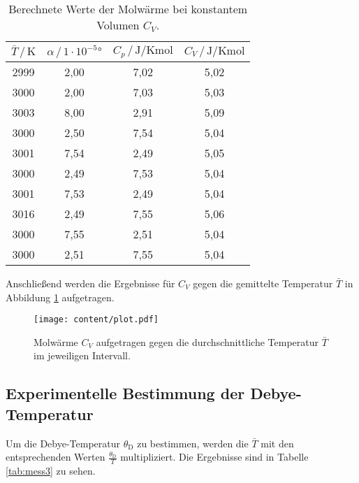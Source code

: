 \begin{table}
    \centering
    \caption{Berechnete Werte der Molwärme bei konstantem Volumen $C_V$.}
    \label{tab:mess2}
    \begin{tabular}{c c c c}
    \toprule
    $\bar{T} \,/\, \si{\kelvin}$ & $\alpha \,/\, 1\cdot 10^{-5}\si{\degree}$ & $C_p \,/\, \si{\joule\per\kelvin\mole}$
    & $C_V \,/\, \si{\joule\per\kelvin\mole}$\\
    \midrule 
        2999 & 2,00 & 7,02 & 5,02\\
        3000 & 2,00 & 7,03 & 5,03\\
        3003 & 8,00 & 2,91 & 5,09\\
        3000 & 2,50 & 7,54 & 5,04\\
        3001 & 7,54 & 2,49 & 5,05\\
        3000 & 2,49 & 7,53 & 5,04\\
        3001 & 7,53 & 2,49 & 5,04\\
        3016 & 2,49 & 7,55 & 5,06\\
        3000 & 7,55 & 2,51 & 5,04\\
        3000 & 2,51 & 7,55 & 5,04\\
    \bottomrule
    \end{tabular}
\end{table}

Anschließend werden die Ergebnisse für $C_V$ gegen die gemittelte Temperatur $\bar{T}$ in Abbildung \ref{fig:plot} aufgetragen. 

\begin{figure}
  \centering
  \texttt{[image: content/plot.pdf]}
  \caption{Molwärme $C_V$ aufgetragen gegen die durchschnittliche Temperatur $\bar{T}$ im jeweiligen Intervall.}
  \label{fig:plot}
\end{figure}

\subsection{Experimentelle Bestimmung der Debye-Temperatur}

Um die Debye-Temperatur $\theta_\text{D}$ zu bestimmen, werden die $\bar{T}$ mit den entsprechenden Werten $\frac{\theta_\text{D}}{T}$ \cite{Anleitung} multipliziert. 
Die Ergebnisse sind in Tabelle \ref{tab:mess3} zu sehen.\\

